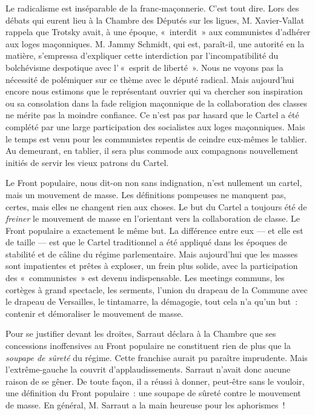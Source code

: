 \documentclass[french,twoside]{book} %
\begin{document}
Le radicalisme est inséparable de la franc-maçonnerie. C’est tout dire. Lors des débats qui eurent lieu à la Chambre des Députés sur les ligues, M. Xavier-Vallat rappela que Trotsky avait, à une époque, « interdit » aux communistes d’adhérer aux loges maçonniques. M. Jammy Schmidt, qui est, paraît-il, une autorité en la matière, s’empressa d’expliquer cette interdiction par l’incompatibilité du bolchévisme despotique avec l’ « esprit de liberté ». Nous ne voyons pas la nécessité de polémiquer  sur ce thème avec le député radical. Mais aujourd’hui encore nous estimons que le représentant ouvrier qui va chercher son inspiration ou sa consolation dans la fade religion maçonnique de la collaboration des classes ne mérite pas la moindre confiance. Ce n’est pas par hasard que le Cartel a été complété par une large participation des socialistes aux loges maçonniques. Mais le temps est venu pour les communistes repentis de ceindre eux-mêmes le tablier. Au demeurant, en tablier, il sera plus commode aux compagnons nouvellement initiés de servir les vieux patrons du Cartel.\par
Le Front populaire, nous dit-on non sans indignation, n’est nullement un cartel, mais un mouvement de masse. Les définitions pompeuses ne manquent pas, certes, mais elles ne changent rien aux choses. Le but du Cartel a toujours été de \emph{freiner} le mouvement de masse en l’orientant vers la collaboration de classe. Le Front populaire a exactement le même but. La différence entre eux — et elle est de taille — est que le Cartel traditionnel a été appliqué dans les époques de stabilité et de câline du régime parlementaire. Mais aujourd’hui que les masses sont impatientes et prêtes à exploser, un frein plus solide, avec la participation des « communistes » est devenu indispensable. Les meetings communs, les cortèges à grand spectacle, les serments, l’union du drapeau de la Commune avec le drapeau de Versailles, le tintamarre, la démagogie, tout cela n’a qu’un but : contenir et démoraliser le mouvement de masse.\par
Pour se justifier devant les droites, Sarraut déclara à la Chambre que ses concessions inoffensives au Front populaire ne constituent rien de plus que la \emph{soupape de sûreté }du régime. Cette franchise aurait pu paraître imprudente. Mais l’extrême-gauche la couvrit d’applaudissements. Sarraut n’avait donc aucune raison de se gêner. De toute façon, il a réussi à donner, peut-être sans le vouloir, une  définition du Front populaire : une soupape de sûreté contre le mouvement de masse. En général, M. Sarraut a la main heureuse pour les aphorismes !\par
\end{document}
